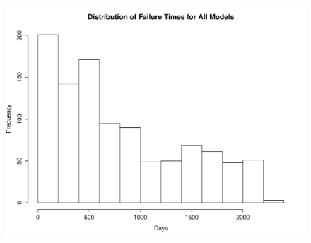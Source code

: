 \documentclass{article}
\begin{document}
\begin{figure}[H]
\centering
\includegraphics[height=12cm]{sumstat2.pdf}
\end{figure}
\end{document}
